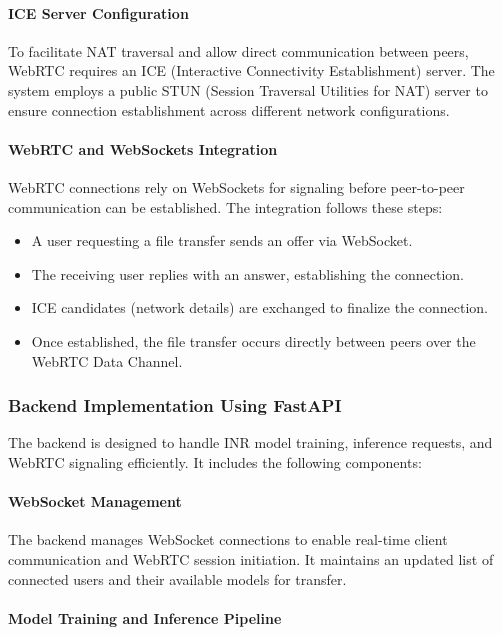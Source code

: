 \paragraph{ICE Server Configuration}

To facilitate NAT traversal and allow direct communication between peers, WebRTC requires an ICE (Interactive Connectivity Establishment) server. The system employs a public STUN (Session Traversal Utilities for NAT) server to ensure connection establishment across different network configurations.

\paragraph{WebRTC and WebSockets Integration}

WebRTC connections rely on WebSockets for signaling before peer-to-peer communication can be established. The integration follows these steps:

\begin{itemize}
    \item A user requesting a file transfer sends an offer via WebSocket.
    \item The receiving user replies with an answer, establishing the connection.
    \item ICE candidates (network details) are exchanged to finalize the connection.
    \item Once established, the file transfer occurs directly between peers over the WebRTC Data Channel.
\end{itemize}

\subsubsection{Backend Implementation Using FastAPI}

The backend is designed to handle INR model training, inference requests, and WebRTC signaling efficiently. It includes the following components:

\paragraph{WebSocket Management}

The backend manages WebSocket connections to enable real-time client communication and WebRTC session initiation. It maintains an updated list of connected users and their available models for transfer.

\paragraph{Model Training and Inference Pipeline}

